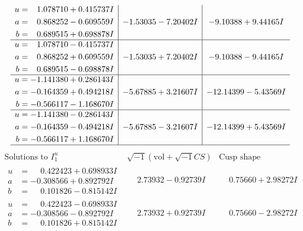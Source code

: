 \documentclass[1p]{elsarticle_modified}
\theoremstyle{definition}
\newcommand{\I}{\sqrt{-1}}
\begin{document}
$$\begin{array}{c|c|c}
\begin{aligned}
u &= \phantom{-}1.078710 + 0.415737 I \\
a &= \phantom{-}0.868252 - 0.609559 I \\
b &= \phantom{-}0.689515 + 0.698878 I\end{aligned}
 & -1.53035 - 7.20402 I & -9.10388 + 9.44165 I \\ \hline\begin{aligned}
u &= \phantom{-}1.078710 - 0.415737 I \\
a &= \phantom{-}0.868252 + 0.609559 I \\
b &= \phantom{-}0.689515 - 0.698878 I\end{aligned}
 & -1.53035 + 7.20402 I & -9.10388 - 9.44165 I \\ \hline\begin{aligned}
u &= -1.141380 + 0.286143 I \\
a &= -0.164359 + 0.494218 I \\
b &= -0.566117 - 1.168670 I\end{aligned}
 & -5.67885 + 3.21607 I & -12.14399 - 5.43569 I \\ \hline\begin{aligned}
u &= -1.141380 - 0.286143 I \\
a &= -0.164359 - 0.494218 I \\
b &= -0.566117 + 1.168670 I\end{aligned}
 & -5.67885 - 3.21607 I & -12.14399 + 5.43569 I\\
 \hline 
 \end{array}$$\newpage$$\begin{array}{c|c|c}  
\text{Solutions to }I^u_{1}& \I (\text{vol} + \sqrt{-1}CS) & \text{Cusp shape}\\
 \hline 
\begin{aligned}
u &= \phantom{-}0.422423 + 0.698933 I \\
a &= -0.308566 + 0.892792 I \\
b &= \phantom{-}0.101826 - 0.815142 I\end{aligned}
 & \phantom{-}2.73932 - 0.92739 I & \phantom{-}0.75660 + 2.98272 I \\ \hline\begin{aligned}
u &= \phantom{-}0.422423 - 0.698933 I \\
a &= -0.308566 - 0.892792 I \\
b &= \phantom{-}0.101826 + 0.815142 I\end{aligned}
 & \phantom{-}2.73932 + 0.92739 I & \phantom{-}0.75660 - 2.98272 I \\ \hline\begin{aligned}

\end{aligned}
\end{array}$$
\end{document}
